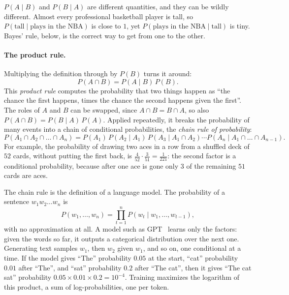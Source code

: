 \begin{warning}
  $P(A \mid B)$ and $P(B \mid A)$ are different quantities, and they can
  be wildly different. Almost every professional basketball player is
  tall, so $P(\text{tall} \mid \text{plays in the NBA})$ is close to
  $1$, yet $P(\text{plays in the NBA} \mid \text{tall})$ is tiny.
  Bayes' rule, below, is the correct way to get from one to the other.
\end{warning}

\paragraph{The product rule.}
Multiplying the definition through by $P(B)$ turns it around:
\begin{equation}
  P(A \cap B) = P(A \mid B)\, P(B) .
  \label{eq:ch05-product-rule}
\end{equation}
This \emph{product rule} computes the probability that two things happen
as ``the chance the first happens, times the chance the second happens
given the first''. The roles of $A$ and $B$ can be swapped, since $A
\cap B = B \cap A$, so also $P(A \cap B) = P(B \mid A)\,P(A)$. Applied
repeatedly, it breaks the probability of many events into a chain of
conditional probabilities, the \emph{chain rule of probability}:
\begin{equation}
  P(A_1 \cap A_2 \cap \dots \cap A_n)
  = P(A_1)\, P(A_2 \mid A_1)\, P(A_3 \mid A_1 \cap A_2) \cdots
    P(A_n \mid A_1 \cap \dots \cap A_{n-1}) .
  \label{eq:ch05-chain-rule}
\end{equation}
For example, the probability of drawing two aces in a row from a
shuffled deck of $52$ cards, without putting the first back, is
$\frac{4}{52} \cdot \frac{3}{51} = \frac{1}{221}$: the second factor is
a conditional probability, because after one ace is gone only $3$ of
the remaining $51$ cards are aces.

\begin{aibox}
  The chain rule is the definition of a language model. The probability
  of a sentence $w_1 w_2 \dots w_n$ is
  \[
    P(w_1, \dots, w_n) = \prod_{t=1}^{n} P(w_t \mid w_1, \dots, w_{t-1}),
  \]
  with no approximation at all. A model such as
  GPT~\cite{radford2018gpt} learns only the
  factors: given the words so far, it outputs a categorical distribution
  over the next one. Generating text samples $w_1$, then $w_2$ given
  $w_1$, and so on, one conditional at a time. If the model gives
  ``The'' probability $0.05$ at the start, ``cat'' probability $0.01$
  after ``The'', and ``sat'' probability $0.2$ after ``The cat'', then
  it gives ``The cat sat'' probability $0.05 \times 0.01 \times 0.2 =
  10^{-4}$. Training maximizes the logarithm of this product, a sum of
  log-probabilities, one per token.
\end{aibox}

